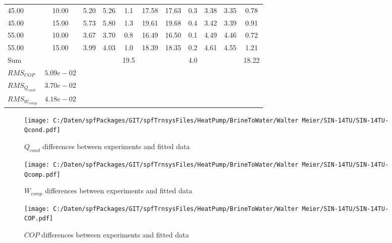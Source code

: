 \documentclass[english]{SPFShortReport}
\begin{document}
\begin{table}[!ht]
\begin{small}
\begin{center}
{\begin{tabular}{l | c c c c c c c c c c }
45.00  & 10.00 & 5.20 & 5.26 & 1.1 & 17.58 & 17.63 & 0.3 & 3.38 & 3.35 & 0.78\\ 
45.00  & 15.00 & 5.73 & 5.80 & 1.3 & 19.61 & 19.68 & 0.4 & 3.42 & 3.39 & 0.91\\ 
55.00  & 10.00 & 3.67 & 3.70 & 0.8 & 16.49 & 16.50 & 0.1 & 4.49 & 4.46 & 0.72\\ 
55.00  & 15.00 & 3.99 & 4.03 & 1.0 & 18.39 & 18.35 & 0.2 & 4.61 & 4.55 & 1.21\\ 
\hline 
 Sum &  & &  & 19.5 &  &  & 4.0 & &  & 18.22\\ 
\hline 
 $RMS_{COP}$ & $5.09e-02$ \\ 
 $RMS_{Q_{cond}}$ & $3.70e-02$ \\ 
 $RMS_{W_{comp}}$ & $4.18e-02$ \\ 
\hline
\hline
\end{tabular}
}
\label{ErrorsTable}
\end{center}
\end{small}
\end{table}
\begin{figure}[!ht]
\begin{center}
\texttt{[image: C:/Daten/spfPackages/GIT/spfTrnsysFiles/HeatPump/BrineToWater/Walter Meier/SIN-14TU/SIN-14TU-Qcond.pdf]}
\caption{$Q_{cond}$ differences between experiments and fitted data}
\label{QcongFig}
\end{center}
\end{figure}
\begin{figure}[!ht]
\begin{center}
\texttt{[image: C:/Daten/spfPackages/GIT/spfTrnsysFiles/HeatPump/BrineToWater/Walter Meier/SIN-14TU/SIN-14TU-Qcomp.pdf]}
\caption{$W_{comp}$ differences between experiments and fitted data}
\label{QcompFig}
\end{center}
\end{figure}
\begin{figure}[!ht]
\begin{center}
\texttt{[image: C:/Daten/spfPackages/GIT/spfTrnsysFiles/HeatPump/BrineToWater/Walter Meier/SIN-14TU/SIN-14TU-COP.pdf]}
\caption{$COP$ differences between experiments and fitted data}
\label{COPFig}
\end{center}
\end{figure}
\end{document}
